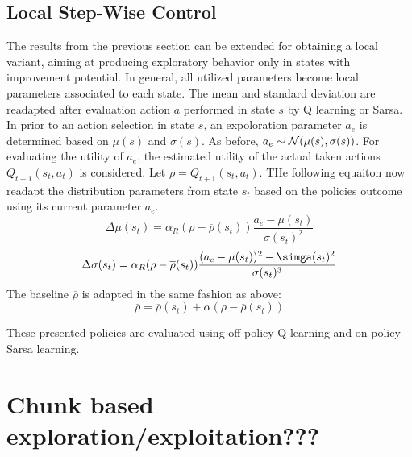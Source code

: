 \documentclass[10.5pt]{article}
\begin{document}
\subsection{Local Step-Wise Control}
The results from the previous section can be extended for obtaining a local variant, aiming at producing exploratory behavior only in states with improvement potential. In general, all utilized parameters become local parameters associated to each state. The mean and standard deviation are readapted after evaluation action $a$ performed in state $s$ by Q learning or Sarsa. In prior to an action selection in state $s$, an expoloration parameter $a_e$ is determined based on $\mu(s)$ and $\sigma(s)$. As before, $a_e\sim {\cal N}(\mu(s), \sigma(s))$. For evaluating the utility of $a_e$, the estimated utility of the actual taken actions $Q_{t+1}(s_t, a_t)$ is considered. Let $\rho = Q_{t+1}(s_t, a_t)$. THe following equaiton now readapt the distribution parameters from state $s_t$ based on the policies outcome using its current parameter $a_e$. 
\begin{equation}
\Delta\mu(s_t) = \alpha_R (\rho - \overline{\rho}(s_t)) \dfrac{a_e -\mu(s_t)}{\sigma(s_t)^2}
\end{equation} 
\begin{equation}
\Delta \sigma (s_t) = \alpha_R (\rho - \overline{\rho}(s_t))\dfrac{(a_e-\mu(s_t))^2-\simga(s_t)^2}{\sigma(s_t)^3}
\end{equation}
The baseline $\overline{\rho}$ is adapted in the same fashion as above: 
\begin{equation}
\overline{\rho} = \overline{\rho}(s_t) + \alpha(\rho - \overline{\rho}(s_t))
\end{equation}

These presented policies are evaluated using off-policy Q-learning and on-policy Sarsa learning. 
\section{Chunk based exploration/exploitation???}
\end{document}
